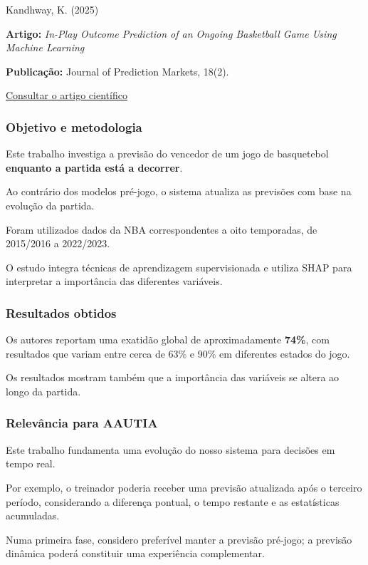Kandhway, K. (2025) \cite{kandhway2025}

\textbf{Artigo:} \emph{In-Play Outcome Prediction of an Ongoing
Basketball Game Using Machine Learning}

\textbf{Publicação:} Journal of Prediction Markets, 18(2).

\href{https://doi.org/10.5750/jpm.v18i2.2155}{Consultar o artigo
científico}

\subsubsection{Objetivo e metodologia}\label{aautia:objetivo-e-metodologia-3}

Este trabalho investiga a previsão do vencedor de um jogo de basquetebol
\textbf{enquanto a partida está a decorrer}.

Ao contrário dos modelos pré-jogo, o sistema atualiza as previsões com
base na evolução da partida.

Foram utilizados dados da NBA correspondentes a oito temporadas, de
2015/2016 a 2022/2023.

O estudo integra técnicas de aprendizagem supervisionada e utiliza SHAP
para interpretar a importância das diferentes variáveis.

\subsubsection{Resultados obtidos}\label{aautia:resultados-obtidos-1}

Os autores reportam uma exatidão global de aproximadamente
\textbf{74\%}, com resultados que variam entre cerca de 63\% e 90\% em
diferentes estados do jogo.

Os resultados mostram também que a importância das variáveis se altera
ao longo da partida.

\subsubsection{Relevância para
AAUTIA}\label{aautia:relevuxe2ncia-para-aautia-3}

Este trabalho fundamenta uma evolução do nosso sistema para decisões em
tempo real.

Por exemplo, o treinador poderia receber uma previsão atualizada após o
terceiro período, considerando a diferença pontual, o tempo restante e
as estatísticas acumuladas.

Numa primeira fase, considero preferível manter a previsão pré-jogo; a
previsão dinâmica poderá constituir uma experiência complementar.

